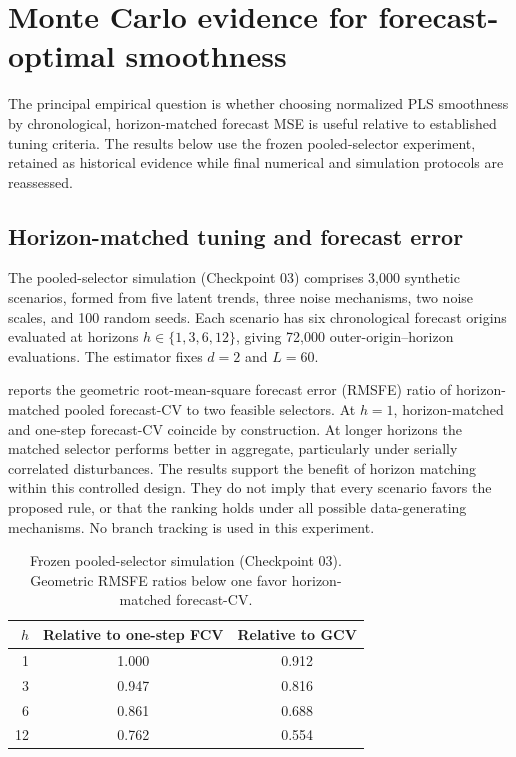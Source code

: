 \section{Monte Carlo evidence for forecast-optimal smoothness}
\label{sec:empirical}

The principal empirical question is whether choosing normalized PLS
smoothness by chronological, horizon-matched forecast MSE is useful
relative to established tuning criteria. The results below use the frozen pooled-selector
experiment, retained as historical evidence while final
numerical and simulation protocols are reassessed.

\subsection{Horizon-matched tuning and forecast error}

The pooled-selector simulation (Checkpoint 03) comprises 3,000 synthetic
scenarios, formed from five latent trends, three noise mechanisms, two noise
scales, and 100 random seeds. Each scenario has six chronological forecast
origins evaluated at horizons $h\in\{1,3,6,12\}$, giving 72,000
outer-origin--horizon evaluations. The estimator fixes $d=2$ and $L=60$.

 reports the geometric root-mean-square forecast error
(RMSFE) ratio of horizon-matched pooled forecast-CV to two feasible selectors.
At $h=1$, horizon-matched and one-step forecast-CV coincide by construction.
At longer horizons the matched selector performs better in aggregate,
particularly under serially correlated disturbances. The results support the benefit of horizon matching within
this controlled design. They do not imply that every scenario
favors the proposed rule, or that the ranking holds under
all possible data-generating mechanisms. No branch tracking
is used in this experiment.

\begin{table}[t]
\centering
\caption{Frozen pooled-selector simulation (Checkpoint 03). Geometric RMSFE
ratios below one favor horizon-matched forecast-CV.}
\label{tab:cp03}
\begin{tabular}{@{}rcc@{}}
\toprule
$h$ & Relative to one-step FCV & Relative to GCV \\
\midrule
1  & 1.000 & 0.912 \\
3  & 0.947 & 0.816 \\
6  & 0.861 & 0.688 \\
12 & 0.762 & 0.554 \\
\bottomrule
\end{tabular}
\end{table}


